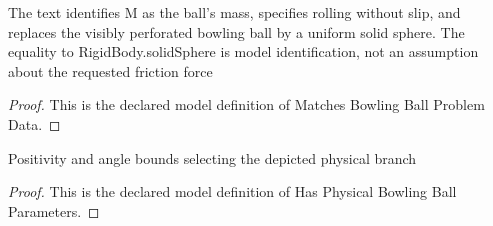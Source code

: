 \begin{definition}
  \label{def:physics:phyx-mini-0825:phyxminiproblems-problemphyxmini0825-matchesbowlingballproblemdata}
  The text identifies M as the ball's mass, specifies rolling without slip, and replaces the visibly perforated bowling ball by a uniform solid sphere. The equality to RigidBody.solidSphere is model identification, not an assumption about the requested friction force
\end{definition}
\begin{proof}
  This is the declared model definition of Matches Bowling Ball Problem Data.
\end{proof}
\begin{definition}
  \label{def:physics:phyx-mini-0825:phyxminiproblems-problemphyxmini0825-hasphysicalbowlingballparameters}
  Positivity and angle bounds selecting the depicted physical branch
\end{definition}
\begin{proof}
  This is the declared model definition of Has Physical Bowling Ball Parameters.
\end{proof}
